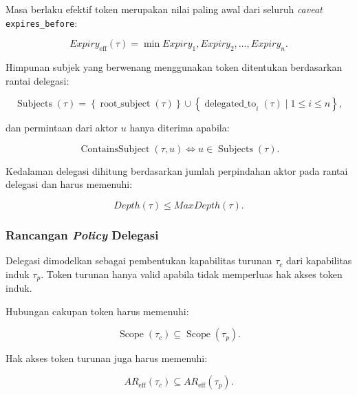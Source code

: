 \documentclass[bahasa, 12pt, a4paper, onecolumn, oneside, final]{report}
\begin{document}
Masa berlaku efektif token merupakan nilai paling awal dari seluruh \textit{caveat} \texttt{expires\_before}:

\begin{equation}
	Expiry_{\operatorname{eff}}(\tau)
	=
	\min
	{
		Expiry_1,Expiry_2,\ldots,Expiry_n
	}.
\end{equation}

Himpunan subjek yang berwenang menggunakan token ditentukan berdasarkan rantai delegasi:

\begin{equation}
	\operatorname{Subjects}(\tau)
	=
	\left\{
	\operatorname{root\_subject}(\tau)
	\right\}
	\cup
	\left\{
	\operatorname{delegated\_to}_i(\tau)
	\mid
	1 \leq i \leq n
	\right\},
\end{equation}

dan permintaan dari aktor $u$ hanya diterima apabila:

\begin{equation}
	\operatorname{ContainsSubject}(\tau,u)
	\iff
	u \in \operatorname{Subjects}(\tau).
\end{equation}

Kedalaman delegasi dihitung berdasarkan jumlah perpindahan aktor pada rantai delegasi dan harus memenuhi:

\begin{equation}
	Depth(\tau)
	\leq
	MaxDepth(\tau).
\end{equation}

\subsubsection{Rancangan \textit{Policy} Delegasi}

Delegasi dimodelkan sebagai pembentukan kapabilitas turunan $\tau_c$ dari kapabilitas induk $\tau_p$. Token turunan hanya valid apabila tidak memperluas hak akses token induk.

Hubungan cakupan token harus memenuhi:

\begin{equation}
	\operatorname{Scope}(\tau_c)
	\subseteq
	\operatorname{Scope}(\tau_p).
\end{equation}

Hak akses token turunan juga harus memenuhi:

\begin{equation}
	AR_{\operatorname{eff}}(\tau_c)
	\subseteq
	AR_{\operatorname{eff}}(\tau_p).
\end{equation}
\end{document}
